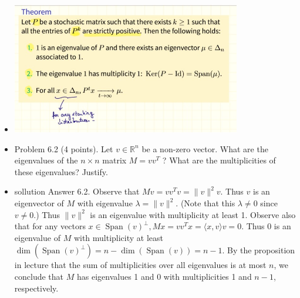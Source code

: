 \documentclass[12pt,twoside]{article}
\begin{document}
\begin{itemize}
\item \includegraphics[width=10cm]{final Review/long term 2 .jpg}

\item Problem 6.2 (4 points). Let $v \in \mathbb{R}^n$ be a non-zero vector. What are the eigenvalues of the $n \times n$ matrix $M=v v^T$ ? What are the multiplicities of these eigenvalues? Justify.
\item sollution Answer 6.2. Observe that $M v=v v^T v=\|v\|^2 v$. Thus $v$ is an eigenvector of $M$ with eigenvalue $\lambda=\|v\|^2$. (Note that this $\lambda \neq 0$ since $v \neq 0$.) Thus $\|v\|^2$ is an eigenvalue with multiplicity at least 1. Observe also that for any vectors $x \in \operatorname{Span}(v)^{\perp}, M x=v v^T x=\langle x, v\rangle v=0$. Thus 0 is an eigenvalue of $M$ with multiplicity at least $\operatorname{dim}\left(\operatorname{Span}(v)^{\perp}\right)=n-\operatorname{dim}(\operatorname{Span}(v))=n-1$. By the proposition in lecture that the sum of multiplicities over all eigenvalues is at most $n$, we conclude that $M$ has eigenvalues 1 and 0 with multiplicities 1 and $n-1$, respectively.



\end{itemize}
\end{document}

